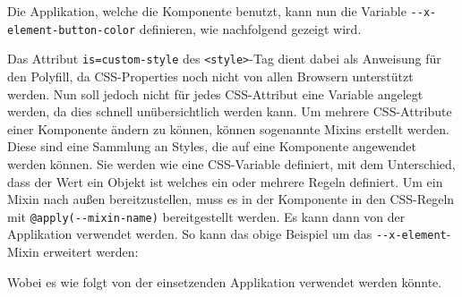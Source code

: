 Die Applikation, welche die Komponente benutzt, kann nun die Variable \texttt{-\/-x-element-button-color} definieren, wie nachfolgend gezeigt wird.

\begin{Shaded}
\begin{Highlighting}[]
\KeywordTok{>}
  \KeywordTok{\{}
     \KeywordTok{;}
  \KeywordTok{\}}
\end{Highlighting}
\end{Shaded}

Das Attribut \texttt{is=\dq custom-style\dq} des \texttt{\textless{}style\textgreater{}}-Tag dient dabei als Anweisung für den Polyfill, da CSS-Properties noch nicht von allen Browsern unterstützt werden. Nun soll jedoch nicht für jedes CSS-Attribut eine Variable angelegt werden, da dies schnell unübersichtlich werden kann. Um mehrere CSS-Attribute einer Komponente ändern zu können, können sogenannte Mixins erstellt werden. Diese sind eine Sammlung an Styles, die auf eine Komponente angewendet werden können. Sie werden wie eine CSS-Variable definiert, mit dem Unterschied, dass der Wert ein Objekt ist welches ein oder mehrere Regeln definiert. Um ein Mixin nach außen bereitzustellen, muss es in der Komponente in den CSS-Regeln mit \texttt{@apply(-\/-mixin-name)} bereitgestellt werden. Es kann dann von der Applikation verwendet werden. So kann das obige Beispiel um das \texttt{-\/-x-element}-Mixin erweitert werden:

\begin{Shaded}
\begin{Highlighting}[]
\KeywordTok{>}
       \KeywordTok{\{}
         \NormalTok{)}\KeywordTok{;}
      \KeywordTok{\}}
\end{Highlighting}
\end{Shaded}

Wobei es wie folgt von der einsetzenden Applikation verwendet werden könnte.

\begin{Shaded}
\begin{Highlighting}[]
\KeywordTok{>}
  \KeywordTok{\{}
     \KeywordTok{;}
     \NormalTok{\{}
        \DataTypeTok{10px}\KeywordTok{;}
         \DataTypeTok{10px}\KeywordTok{;}
    \KeywordTok{\}}\NormalTok{;}
  \NormalTok{\}}
\end{Highlighting}
\end{Shaded}


